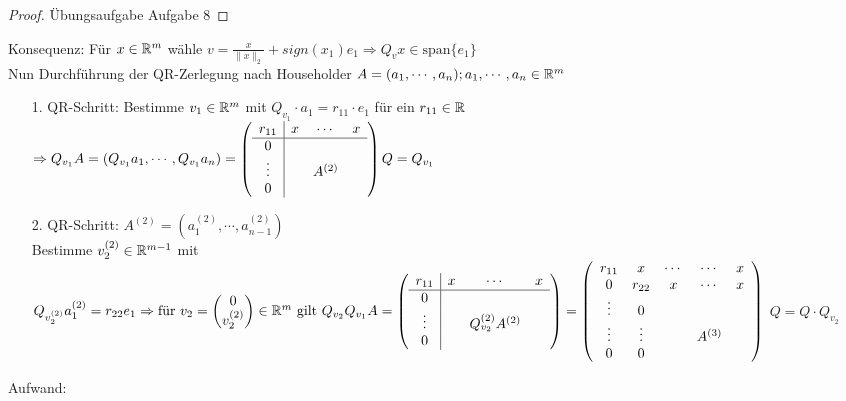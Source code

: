 \begin{proof}
	Übungsaufgabe Aufgabe 8
\end{proof}
Konsequenz: Für $x \in \mathbb R^m$ wähle $v=\frac{x}{\|x\|_2}+ sign(x_1)e_1
\Rightarrow Q_vx \in \text{span}\{e_1\}$\\
\newline
Nun Durchführung der QR-Zerlegung nach Householder $A=(a_1,\cdots,a_n); a_1,\cdots,a_n \in \mathbb R^m$\\
\begin{itemize}
	\item[1.]QR-Schritt: Bestimme $v_1 \in\mathbb R^m$ mit $Q_{v_1}\cdot a_1 = r_{11}\cdot e_1$ für ein $r_{11} \in \mathbb R$\\\newline
	$\Rightarrow Q_{v_1}A=(Q_{v_1}a_1,\cdots,Q_{v_1}a_n) =\left(
	\begin{array}{c|ccc} r_{11} & x & \cdots & x\\ \hline
						 0 & & & \\
						 \vdots & &A^{(2)} &\\
						 0 & & &
	\end{array}\right)\\ Q=Q_{v_1}$
	\item[2.]QR-Schritt: $A^{(2)}= \left(a_1^{(2)},\cdots,a_{n-1}^{(2)}\right)$\\
			Bestimme $v_2^{(2)} \in \mathbb R^{m-1}$ mit $Q_{v_2^{(2)}}a_1^{(2)} = r_{22}e_1\\
			\Rightarrow \text{für } v_2 = \begin{pmatrix}0\\v_2^{(2)}\end{pmatrix}\in \mathbb R^m \text{ gilt } Q_{v_2}Q_{v_1}A=\left(
			\begin{array}{c|ccc} r_{11} & x & \cdots & x\\ \hline
			0 & & & \\
			\vdots & &Q_{v_2}^{(2)}A^{(2)} &\\
			0 & & &
			\end{array}\right) = \left(
			\begin{array}{ccccc} r_{11} & x & \cdots &\cdots & x\\
			0 & r_{22} & x & \cdots & x\\
			\vdots & 0 & &\\
			\vdots & \vdots& &A^{(3)}\\
			0 & 0 & &
			\end{array}\right)$
			$Q=Q\cdot Q_{v_2}$\\
\end{itemize}
Aufwand:
